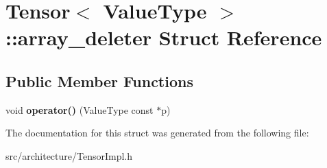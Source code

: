 \hypertarget{structTensor_1_1array__deleter}{}\section{Tensor$<$ Value\+Type $>$\+:\+:array\+\_\+deleter Struct Reference}
\label{structTensor_1_1array__deleter}
\subsection*{Public Member Functions}
\begin{DoxyCompactItemize}
\item 
\mbox{\label{structTensor_1_1array__deleter_aa01ba9dbcd93d3cdbec5ac354d10f3e7}} 
void {\bfseries operator()} (Value\+Type const $\ast$p)
\end{DoxyCompactItemize}


The documentation for this struct was generated from the following file\+:\begin{DoxyCompactItemize}
\item 
src/architecture/Tensor\+Impl.\+h\end{DoxyCompactItemize}
